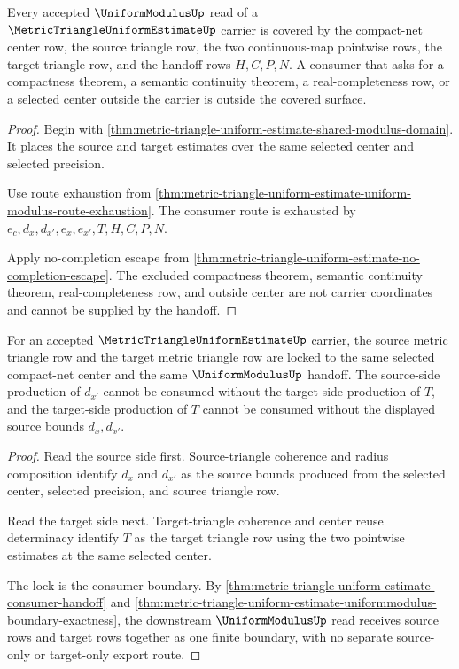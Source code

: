 \begin{theorem}
\label{thm:metric-triangle-uniform-estimate-consumer-coverage}
Every accepted $\UniformModulusUp$ read of a $\MetricTriangleUniformEstimateUp$ carrier is covered by the compact-net center row, the source triangle row, the two continuous-map pointwise rows, the target triangle row, and the handoff rows $H,C,P,N$. A consumer that asks for a compactness theorem, a semantic continuity theorem, a real-completeness row, or a selected center outside the carrier is outside the covered surface.
\end{theorem}
\begin{proof}
Begin with \autoref{thm:metric-triangle-uniform-estimate-shared-modulus-domain}. It places the source and target estimates over the same selected center and selected precision.

Use route exhaustion from \autoref{thm:metric-triangle-uniform-estimate-uniform-modulus-route-exhaustion}. The consumer route is exhausted by $e_c,d_x,d_{x'},e_x,e_{x'},T,H,C,P,N$.

Apply no-completion escape from \autoref{thm:metric-triangle-uniform-estimate-no-completion-escape}. The excluded compactness theorem, semantic continuity theorem, real-completeness row, and outside center are not carrier coordinates and cannot be supplied by the handoff.
\end{proof}

\begin{theorem}
\label{thm:metric-triangle-uniform-estimate-source-target-lock}
For an accepted $\MetricTriangleUniformEstimateUp$ carrier, the source metric triangle row and the target metric triangle row are locked to the same selected compact-net center and the same $\UniformModulusUp$ handoff. The source-side production of $d_{x'}$ cannot be consumed without the target-side production of $T$, and the target-side production of $T$ cannot be consumed without the displayed source bounds $d_x,d_{x'}$.
\end{theorem}
\begin{proof}
Read the source side first. Source-triangle coherence and radius composition identify $d_x$ and $d_{x'}$ as the source bounds produced from the selected center, selected precision, and source triangle row.

Read the target side next. Target-triangle coherence and center reuse determinacy identify $T$ as the target triangle row using the two pointwise estimates at the same selected center.

The lock is the consumer boundary. By \autoref{thm:metric-triangle-uniform-estimate-consumer-handoff} and \autoref{thm:metric-triangle-uniform-estimate-uniformmodulus-boundary-exactness}, the downstream $\UniformModulusUp$ read receives source rows and target rows together as one finite boundary, with no separate source-only or target-only export route.
\end{proof}

